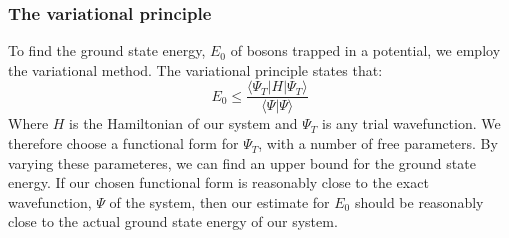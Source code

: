 \documentclass[a4paper, 10pt]{article}
\begin{document}
	\subsubsection{The variational principle}
	To find the ground state energy, $E_0$ of bosons trapped in a potential, we employ the variational method. The variational principle states that:
	\begin{equation}\label{eq:Variational_principle}
	E_0\leq  \frac{\langle \Psi_T |H|\Psi_T \rangle}{\langle \Psi|\Psi\rangle}
	\end{equation}
	Where $H$ is the Hamiltonian of our system and $\Psi_T$ is any trial wavefunction. We therefore choose a functional form for $\Psi_T$, with a number of free parameters. By varying these parameteres, we can find an upper bound for the ground state energy. If our chosen functional form is reasonably close to the exact wavefunction, $\Psi$ of the system, then our estimate for $E_0$ should be reasonably close to the actual ground state energy of our system.
\end{document}
